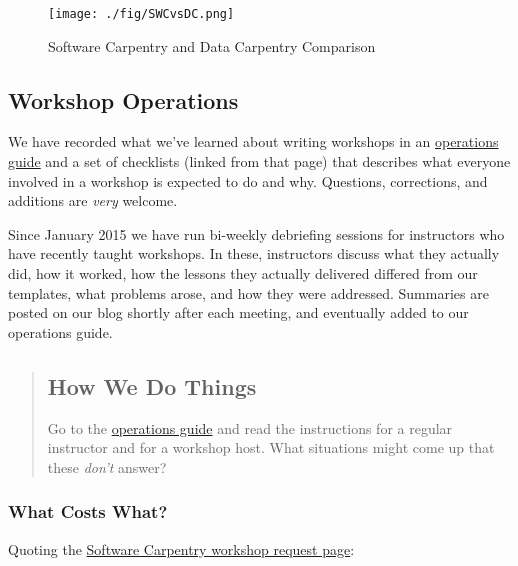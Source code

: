\begin{figure}
\begin{center}
\texttt{[image: ./fig/SWCvsDC.png]}
\end{center}
\caption{Software Carpentry and Data Carpentry Comparison}

\end{figure}

\subsection*{Workshop Operations}

We have recorded what we've learned about writing workshops
in an \href{\{\{ site.swc\_site \}\}/workshops/operations/}{operations guide}
and a set of checklists (linked from that page)
that describes what everyone involved in a workshop is expected to do and why.
Questions, corrections, and additions are \emph{very} welcome.

Since January 2015 we have run bi-weekly debriefing sessions
for instructors who have recently taught workshops.
In these,
instructors discuss what they actually did,
how it worked,
how the lessons they actually delivered differed from our templates,
what problems arose,
and how they were addressed.
Summaries are posted on our blog shortly after each meeting,
and eventually added to our operations guide.

\begin{quotation}   %
\subsection*{How We Do Things}

Go to the \href{\{\{ site.swc\_site \}\}/workshops/operations/}{operations guide}
and read the instructions for a regular instructor
and for a workshop host.
What situations might come up that these \emph{don't} answer?
\end{quotation}   %

\subsubsection*{What Costs What?}

Quoting the \href{\{\{ site.swc\_site\}\}/workshops/request/}{Software Carpentry workshop request page}:

